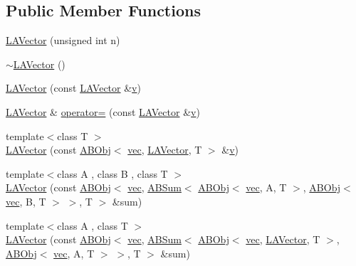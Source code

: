 \subsection*{Public Member Functions}
\begin{DoxyCompactItemize}
\item 
\mbox{\hyperlink{classROOT_1_1Minuit2_1_1LAVector_a3dca313e27f716415056d248bd05cf1f}{L\+A\+Vector}} (unsigned int n)
\item 
\mbox{\hyperlink{classROOT_1_1Minuit2_1_1LAVector_a72c44338e1a37837e9546bfd674c22cb}{$\sim$\+L\+A\+Vector}} ()
\item 
\mbox{\hyperlink{classROOT_1_1Minuit2_1_1LAVector_ad568d638899b4fc3631c3d0a1d76f1cd}{L\+A\+Vector}} (const \mbox{\hyperlink{classROOT_1_1Minuit2_1_1LAVector}{L\+A\+Vector}} \&\mbox{\hyperlink{hadron__timeslice_8cc_a716fc87f5e814be3ceee2405ed6ff22a}{v}})
\item 
\mbox{\hyperlink{classROOT_1_1Minuit2_1_1LAVector}{L\+A\+Vector}} \& \mbox{\hyperlink{classROOT_1_1Minuit2_1_1LAVector_ad38b5ed9fc32389cb68034cde125b203}{operator=}} (const \mbox{\hyperlink{classROOT_1_1Minuit2_1_1LAVector}{L\+A\+Vector}} \&\mbox{\hyperlink{hadron__timeslice_8cc_a716fc87f5e814be3ceee2405ed6ff22a}{v}})
\item 
{\footnotesize template$<$class T $>$ }\\\mbox{\hyperlink{classROOT_1_1Minuit2_1_1LAVector_ac38d854f7a156fc61cabce29416f36cc}{L\+A\+Vector}} (const \mbox{\hyperlink{classROOT_1_1Minuit2_1_1ABObj}{A\+B\+Obj}}$<$ \mbox{\hyperlink{classROOT_1_1Minuit2_1_1vec}{vec}}, \mbox{\hyperlink{classROOT_1_1Minuit2_1_1LAVector}{L\+A\+Vector}}, T $>$ \&\mbox{\hyperlink{hadron__timeslice_8cc_a716fc87f5e814be3ceee2405ed6ff22a}{v}})
\item 
{\footnotesize template$<$class A , class B , class T $>$ }\\\mbox{\hyperlink{classROOT_1_1Minuit2_1_1LAVector_a67f11f13d8b0880924b95b6e90c0005a}{L\+A\+Vector}} (const \mbox{\hyperlink{classROOT_1_1Minuit2_1_1ABObj}{A\+B\+Obj}}$<$ \mbox{\hyperlink{classROOT_1_1Minuit2_1_1vec}{vec}}, \mbox{\hyperlink{classROOT_1_1Minuit2_1_1ABSum}{A\+B\+Sum}}$<$ \mbox{\hyperlink{classROOT_1_1Minuit2_1_1ABObj}{A\+B\+Obj}}$<$ \mbox{\hyperlink{classROOT_1_1Minuit2_1_1vec}{vec}}, A, T $>$, \mbox{\hyperlink{classROOT_1_1Minuit2_1_1ABObj}{A\+B\+Obj}}$<$ \mbox{\hyperlink{classROOT_1_1Minuit2_1_1vec}{vec}}, B, T $>$ $>$, T $>$ \&sum)
\item 
{\footnotesize template$<$class A , class T $>$ }\\\mbox{\hyperlink{classROOT_1_1Minuit2_1_1LAVector_a954c19ce9b70651d06203ca76e59b0da}{L\+A\+Vector}} (const \mbox{\hyperlink{classROOT_1_1Minuit2_1_1ABObj}{A\+B\+Obj}}$<$ \mbox{\hyperlink{classROOT_1_1Minuit2_1_1vec}{vec}}, \mbox{\hyperlink{classROOT_1_1Minuit2_1_1ABSum}{A\+B\+Sum}}$<$ \mbox{\hyperlink{classROOT_1_1Minuit2_1_1ABObj}{A\+B\+Obj}}$<$ \mbox{\hyperlink{classROOT_1_1Minuit2_1_1vec}{vec}}, \mbox{\hyperlink{classROOT_1_1Minuit2_1_1LAVector}{L\+A\+Vector}}, T $>$, \mbox{\hyperlink{classROOT_1_1Minuit2_1_1ABObj}{A\+B\+Obj}}$<$ \mbox{\hyperlink{classROOT_1_1Minuit2_1_1vec}{vec}}, A, T $>$ $>$, T $>$ \&sum)

\end{DoxyCompactItemize}
